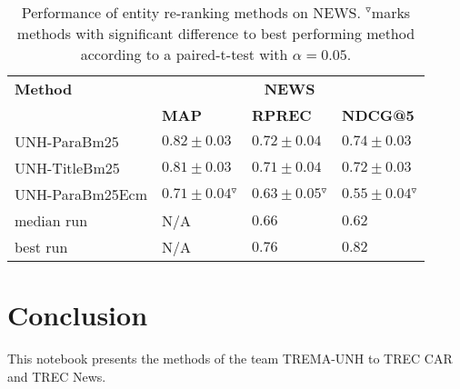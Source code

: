 \documentclass{article}
\begin{document}
\begin{table}
\centering \caption{Performance of entity re-ranking methods on NEWS. $^{\triangledown}$marks
methods with significant difference to best performing method according
to a paired-t-test with $\alpha=0.05$.\label{tab:news-results}}
\begin{center}
\begin{tabular}{llll}
\toprule 
\textbf{Method}  & \multicolumn{3}{c}{\textbf{NEWS}}\tabularnewline
\cmidrule(lr){2-4}  & \textbf{MAP}  & \textbf{RPREC}  & \textbf{NDCG@5} \tabularnewline
\midrule 
UNH-ParaBm25 & $0.82\pm0.03$ & $0.72\pm0.04$ & $0.74\pm0.03$\tabularnewline
UNH-TitleBm25 & $0.81\pm0.03$ & $0.71\pm0.04$ & $0.72\pm0.03$\tabularnewline
UNH-ParaBm25Ecm & $0.71\pm0.04$$^{\triangledown}$ & $0.63\pm0.05$$^{\triangledown}$ & $0.55\pm0.04{}^{\triangledown}$\tabularnewline
\midrule
median run & N/A & $0.66$ & $0.62$\tabularnewline
best run & N/A & $0.76$ & $0.82$\tabularnewline
\bottomrule
\end{tabular}
\end{center}
\end{table}






\section{Conclusion}

This notebook presents the methods of the team TREMA-UNH to TREC CAR and TREC News. 











\end{document}
